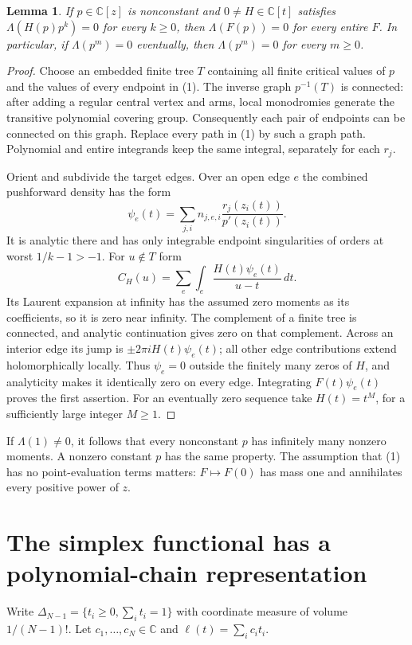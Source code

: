 \documentclass[11pt]{article}
\newtheorem{lemma}[theorem]{Lemma}
\newcommand{\C}{\mathbb C}
\begin{document}
\begin{lemma}\label{lem:chain}
If $p\in\C[z]$ is nonconstant and $0\ne H\in\C[t]$ satisfies
$\Lambda(H(p)p^k)=0$ for every $k\ge0$, then
$\Lambda(F(p))=0$ for every entire $F$. In particular, if
$\Lambda(p^m)=0$ eventually, then $\Lambda(p^m)=0$ for every $m\ge0$.
\end{lemma}
\begin{proof}
Choose an embedded finite tree $T$ containing all finite critical values
of $p$ and the values of every endpoint in (1). The inverse graph
$p^{-1}(T)$ is connected: after adding a regular central vertex and arms,
local monodromies generate the transitive polynomial covering group.
Consequently each pair of endpoints can be connected on this graph.
Replace every path in (1) by such a graph path. Polynomial and entire
integrands keep the same integral, separately for each $r_j$.

Orient and subdivide the target edges. Over an open edge $e$ the combined
pushforward density has the form
\[
 \psi_e(t)=\sum_{j,i} n_{j,e,i}
              \frac{r_j(z_i(t))}{p'(z_i(t))}.
\]
It is analytic there and has only integrable endpoint singularities of
orders at worst $1/k-1>-1$. For $u\notin T$ form
\[
 C_H(u)=\sum_e\int_e\frac{H(t)\psi_e(t)}{u-t}\,dt.
\]
Its Laurent expansion at infinity has the assumed zero moments as its
coefficients, so it is zero near infinity. The complement of a finite
tree is connected, and analytic continuation gives zero on that complement.
Across an interior edge its jump is $\pm2\pi i H(t)\psi_e(t)$; all other
edge contributions extend holomorphically locally. Thus $\psi_e=0$
outside the finitely many zeros of $H$, and analyticity makes it identically
zero on every edge. Integrating $F(t)\psi_e(t)$ proves the first assertion.
For an eventually zero sequence take $H(t)=t^M$, for a sufficiently large
integer $M\ge1$.
\end{proof}

If $\Lambda(1)\ne0$, it follows that every nonconstant $p$ has infinitely
many nonzero moments. A nonzero constant $p$ has the same property.
The assumption that (1) has no point-evaluation terms matters:
$F\mapsto F(0)$ has mass one and annihilates every positive power of $z$.

\section{The simplex functional has a polynomial-chain representation}
Write $\Delta_{N-1}=\{t_i\ge0,\sum_i t_i=1\}$ with coordinate measure
of volume $1/(N-1)!$. Let $c_1,\ldots,c_N\in\C$ and
$\ell(t)=\sum_i c_i t_i$.
\end{document}
